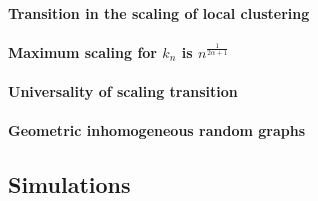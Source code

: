 
\paragraph{Transition in the scaling of local clustering}

\paragraph{Maximum scaling for $k_n$ is $n^{\frac{1}{2\alpha +1}}$}

\paragraph{Universality of scaling transition}

\paragraph{Geometric inhomogeneous random graphs}

%


\subsection{Simulations}\label{ssec:simulations}